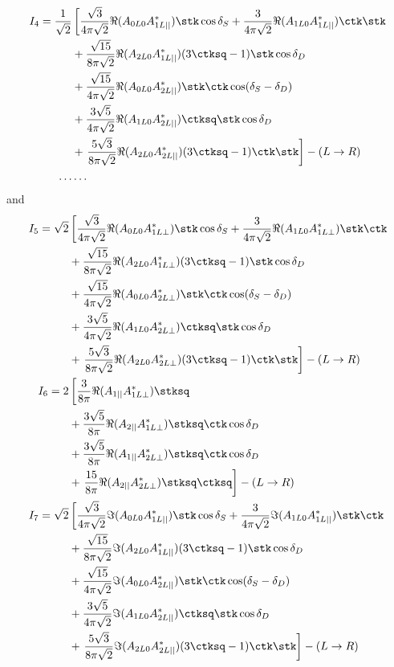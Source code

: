 \begin{align}
 I_4 = \frac{1}{\sqrt{2}} &  \left[  \frac{\sqrt{3}}{4\pi\sqrt{2}} \Re( A_{0L0} A_{1L||}^{*} )\stk\cos\delta_S + \frac{3}{4\pi\sqrt{2}} \Re( A_{1L0} A_{1L||}^{*} ) \ctk\stk    \right. \nonumber \\
    & + \frac{\sqrt{15}}{8\pi\sqrt{2}} \Re( A_{2L0} A_{1L||}^{*} ) (3\ctksq-1) \stk \cos\delta_D \nonumber \\
    & + \frac{\sqrt{15}}{4\pi\sqrt{2}} \Re( A_{0L0} A_{2L||}^{*} )\stk \ctk \cos(\delta_S-\delta_D) \nonumber \\
    & + \frac{3\sqrt{5}}{4\pi\sqrt{2}} \Re( A_{1L0} A_{2L||}^{*} ) \ctksq \stk \cos\delta_D \nonumber \\ 
    & + \left. \frac{5\sqrt{3}}{8\pi\sqrt{2}} \Re( A_{2L0} A_{2L||}^{*} )(3\ctksq-1)\ctk\stk  \right] - ( L\to R)\\
\dots & \dots 
\end{align}
and
\begin{align}
I_5 = \sqrt{2} &  \left[  \frac{\sqrt{3}}{4\pi\sqrt{2}} \Re( A_{0L0} A_{1L\bot}^{*} )\stk\cos\delta_S + \frac{3}{4\pi\sqrt{2}} \Re( A_{1L0} A_{1L\bot}^{*} ) \stk \ctk   \right. \nonumber \\
    & + \frac{\sqrt{15}}{8\pi\sqrt{2}} \Re( A_{2L0} A_{1L\bot}^{*} ) (3\ctksq-1) \stk \cos\delta_D \nonumber \\
    & + \frac{\sqrt{15}}{4\pi\sqrt{2}} \Re( A_{0L0} A_{2L\bot}^{*} )\stk\ctk \cos(\delta_S-\delta_D) \nonumber \\
    & + \frac{3\sqrt{5}}{4\pi\sqrt{2}} \Re( A_{1L0} A_{2L\bot}^{*} ) \ctksq\stk \cos\delta_D \nonumber \\ 
    & + \left. \frac{5\sqrt{3}}{8\pi\sqrt{2}} \Re( A_{2L0} A_{2L\bot}^{*} )(3\ctksq-1)\ctk\stk \right] - ( L\to R)\\
I_6 = 2 &  \left[  \frac{3}{8\pi} \Re( A_{1||} A_{1L\bot}^{*} ) \stksq   \right. \nonumber \\
    & + \frac{3\sqrt{5}}{8\pi} \Re( A_{2||} A_{1L\bot}^{*} ) \stksq \ctk \cos\delta_D \nonumber \\
    & + \frac{3\sqrt{5}}{8\pi} \Re( A_{1||} A_{2L\bot}^{*} ) \stksq \ctk \cos\delta_D \nonumber \\ 
    & + \left. \frac{15}{8\pi} \Re( A_{2||} A_{2L\bot}^{*} ) \stksq \ctksq  \right] - ( L\to R)\\
 I_7 = \sqrt{2} &  \left[  \frac{\sqrt{3}}{4\pi\sqrt{2}} \Im( A_{0L0} A_{1L||}^{*} )\stk\cos\delta_S + \frac{3}{4\pi\sqrt{2}} \Im( A_{1L0} A_{1L||}^{*} ) \stk \ctk   \right. \nonumber \\
    & + \frac{\sqrt{15}}{8\pi\sqrt{2}} \Im( A_{2L0} A_{1L||}^{*} ) (3\ctksq-1) \stk \cos\delta_D \nonumber \\
    & + \frac{\sqrt{15}}{4\pi\sqrt{2}} \Im( A_{0L0} A_{2L||}^{*} )\stk\ctk \cos(\delta_S-\delta_D) \nonumber \\
    & + \frac{3\sqrt{5}}{4\pi\sqrt{2}} \Im( A_{1L0} A_{2L||}^{*} ) \ctksq\stk \cos\delta_D \nonumber \\ 
    & + \left. \frac{5\sqrt{3}}{8\pi\sqrt{2}} \Im( A_{2L0} A_{2L||}^{*} )(3\ctksq-1)\ctk\stk  \right] - ( L\to R)
\end{align}
